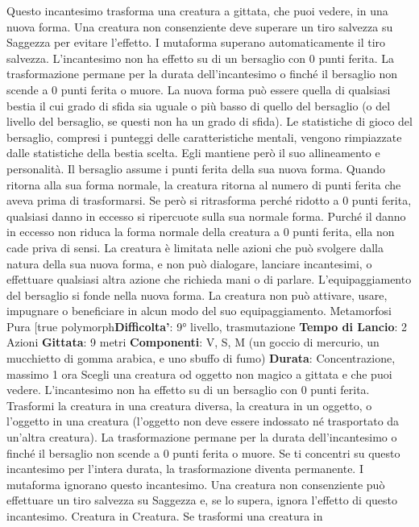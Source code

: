 \begin{multicols}{2}
Questo incantesimo trasforma una creatura a gittata,
che puoi vedere, in una nuova forma. Una creatura non
consenziente deve superare un tiro salvezza su
Saggezza per evitare l’effetto. I mutaforma superano
automaticamente il tiro salvezza. L’incantesimo non ha
effetto su di un bersaglio con 0 punti ferita.
La trasformazione permane per la durata
dell’incantesimo o finché il bersaglio non scende a 0
punti ferita o muore. La nuova forma può essere quella
di qualsiasi bestia il cui grado di sfida sia uguale o più
basso di quello del bersaglio (o del livello del bersaglio,
se questi non ha un grado di sfida). Le statistiche di
gioco del bersaglio, compresi i punteggi delle
caratteristiche mentali, vengono rimpiazzate dalle 
statistiche della bestia scelta. Egli mantiene però il suo
allineamento e personalità.
Il bersaglio assume i punti ferita della sua nuova forma.
Quando ritorna alla sua forma normale, la creatura
ritorna al numero di punti ferita che aveva prima di
trasformarsi. Se però si ritrasforma perché ridotto a 0
punti ferita, qualsiasi danno in eccesso si ripercuote
sulla sua normale forma. Purché il danno in eccesso
non riduca la forma normale della creatura a 0 punti
ferita, ella non cade priva di sensi.
La creatura è limitata nelle azioni che può svolgere
dalla natura della sua nuova forma, e non può
dialogare, lanciare incantesimi, o effettuare qualsiasi
altra azione che richieda mani o di parlare.
L’equipaggiamento del bersaglio si fonde nella nuova
forma. La creatura non può attivare, usare, impugnare o
beneficiare in alcun modo del suo equipaggiamento.
Metamorfosi Pura
[true polymorph\textbf{Difficolta'}:
9° livello, trasmutazione
\textbf{Tempo di Lancio}: 2 Azioni
\textbf{Gittata}: 9 metri
\textbf{Componenti}: V, S, M (un goccio di mercurio, un
mucchietto di gomma arabica, e uno sbuffo di fumo)
\textbf{Durata}: Concentrazione, massimo 1 ora
Scegli una creatura od oggetto non magico a gittata e
che puoi vedere. L’incantesimo non ha effetto su di un
bersaglio con 0 punti ferita. Trasformi la creatura in una
creatura diversa, la creatura in un oggetto, o l’oggetto in
una creatura (l’oggetto non deve essere indossato né
trasportato da un’altra creatura). La trasformazione
permane per la durata dell’incantesimo o finché il
bersaglio non scende a 0 punti ferita o muore. Se ti
concentri su questo incantesimo per l’intera durata, la
trasformazione diventa permanente.
I mutaforma ignorano questo incantesimo. Una creatura
non consenziente può effettuare un tiro salvezza su
Saggezza e, se lo supera, ignora l’effetto di questo
incantesimo.
Creatura in Creatura. Se trasformi una creatura in

\end{multicols}
